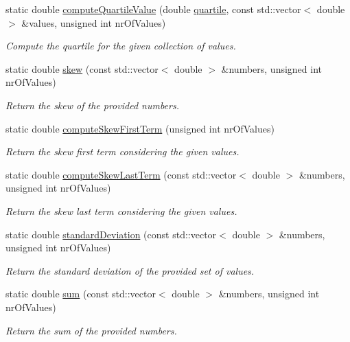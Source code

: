 \begin{DoxyCompactItemize}
static double \hyperlink{classmultiscale_1_1Numeric_ae118c440002c4692a72f03e5c9351727}{compute\-Quartile\-Value} (double \hyperlink{classmultiscale_1_1Numeric_a127a2b3e5e659b4e493767ba23fc45da}{quartile}, const std\-::vector$<$ double $>$ \&values, unsigned int nr\-Of\-Values)
\begin{DoxyCompactList}\small\item\em \-Compute the quartile for the given collection of values. \end{DoxyCompactList}\item 
static double \hyperlink{classmultiscale_1_1Numeric_a8a3a60e7d5c595e42d766963430ad779}{skew} (const std\-::vector$<$ double $>$ \&numbers, unsigned int nr\-Of\-Values)
\begin{DoxyCompactList}\small\item\em \-Return the skew of the provided numbers. \end{DoxyCompactList}\item 
static double \hyperlink{classmultiscale_1_1Numeric_a97ce6f56c4d8af4769d4966ebab72836}{compute\-Skew\-First\-Term} (unsigned int nr\-Of\-Values)
\begin{DoxyCompactList}\small\item\em \-Return the skew first term considering the given values. \end{DoxyCompactList}\item 
static double \hyperlink{classmultiscale_1_1Numeric_a11a1f0d5404dbc729b22df32b4178ba3}{compute\-Skew\-Last\-Term} (const std\-::vector$<$ double $>$ \&numbers, unsigned int nr\-Of\-Values)
\begin{DoxyCompactList}\small\item\em \-Return the skew last term considering the given values. \end{DoxyCompactList}\item 
static double \hyperlink{classmultiscale_1_1Numeric_a8b82f2167d4687c5f4124a5cb1df8e51}{standard\-Deviation} (const std\-::vector$<$ double $>$ \&numbers, unsigned int nr\-Of\-Values)
\begin{DoxyCompactList}\small\item\em \-Return the standard deviation of the provided set of values. \end{DoxyCompactList}\item 
static double \hyperlink{classmultiscale_1_1Numeric_ad54bc039dde4ff22b8c4b5d3708d65bb}{sum} (const std\-::vector$<$ double $>$ \&numbers, unsigned int nr\-Of\-Values)
\begin{DoxyCompactList}\small\item\em \-Return the sum of the provided numbers. \end{DoxyCompactList}\item 

\end{DoxyCompactItemize}
